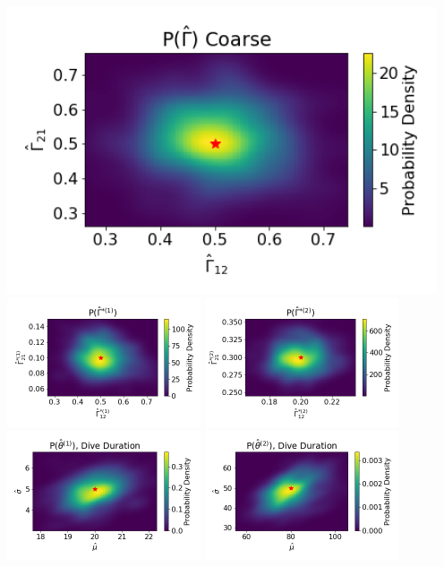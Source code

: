 \documentclass[12pt]{TD-CJS}
\begin{document}
\centering
\includegraphics[width=5in]{../Plots/hhmm_FV_uncorr_Gamma_density_-1.png}
\includegraphics[width=2.25in]{../Plots/hhmm_FV_uncorr_Gamma_density_0.png}
\includegraphics[width=2.25in]{../Plots/hhmm_FV_uncorr_Gamma_density_1.png}
\includegraphics[width=2.25in]{../Plots/hhmm_FV_uncorr_MLE_density_dive_duration_-1_0.png}
\includegraphics[width=2.25in]{../Plots/hhmm_FV_uncorr_MLE_density_dive_duration_-1_1.png}
\end{document}
